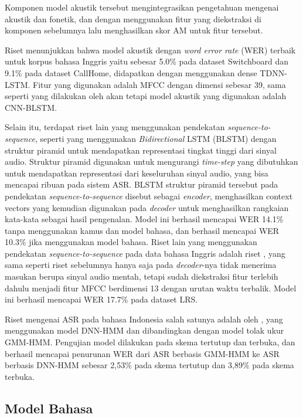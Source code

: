 Komponen model akustik tersebut mengintegrasikan pengetahuan mengenai akustik dan fonetik, dan dengan menggunakan fitur yang diekstraksi di komponen sebelumnya lalu menghasilkan skor AM untuk fitur tersebut.
\bigskip

Riset \textcite{Han2018} menunjukkan bahwa model akustik dengan \textit{word error rate} (WER) terbaik untuk korpus bahasa Inggris yaitu sebesar 5.0\% pada dataset Switchboard dan 9.1\% pada dataset CallHome, didapatkan dengan menggunakan dense TDNN-LSTM. Fitur yang digunakan adalah MFCC dengan dimensi sebesar 39, sama seperti yang dilakukan oleh \textcite{Xiong2017} akan tetapi model akustik yang digunakan adalah CNN-BLSTM.
\bigskip

Selain itu, terdapat riset lain yang menggunakan pendekatan \textit{sequence-to-sequence}, seperti \textcite{Chan2015} yang menggunakan \textit{Bidirectional} LSTM (BLSTM) dengan struktur piramid untuk mendapatkan representasi tingkat tinggi dari sinyal audio. Struktur piramid digunakan untuk mengurangi \textit{time-step} yang dibutuhkan untuk mendapatkan representasi dari keseluruhan sinyal audio, yang bisa mencapai ribuan pada sistem ASR. BLSTM struktur piramid tersebut pada pendekatan \textit{sequence-to-sequence} disebut sebagai \textit{encoder}, menghasilkan context vectors yang kemudian digunakan pada \textit{decoder} untuk menghasilkan rangkaian kata-kata sebagai hasil pengenalan. Model ini berhasil mencapai WER 14.1\% tanpa menggunakan kamus dan model bahasa, dan berhasil mencapai WER 10.3\% jika menggunakan model bahasa. Riset lain yang menggunakan pendekatan \textit{sequence-to-sequence} pada data bahasa Inggris adalah riset \textcite{Chung2017}, yang sama seperti riset sebelumnya hanya saja pada \textit{decoder}-nya tidak menerima masukan berupa sinyal audio mentah, tetapi sudah diekstraksi fitur terlebih dahulu menjadi fitur MFCC berdimensi 13 dengan urutan waktu terbalik. Model ini berhasil mencapai WER 17.7\% pada dataset LRS.
\bigskip

Riset mengenai ASR pada bahasa Indonesia salah satunya adalah oleh \textcite{Yuwan2018}, yang menggunakan model DNN-HMM dan dibandingkan dengan model tolak ukur GMM-HMM. Pengujian model dilakukan pada skema tertutup dan terbuka, dan berhasil mencapai penurunan WER dari ASR berbasis GMM-HMM ke ASR berbasis DNN-HMM sebesar 2,53\% pada skema tertutup dan 3,89\% pada skema terbuka.


\subsection{Model Bahasa}

